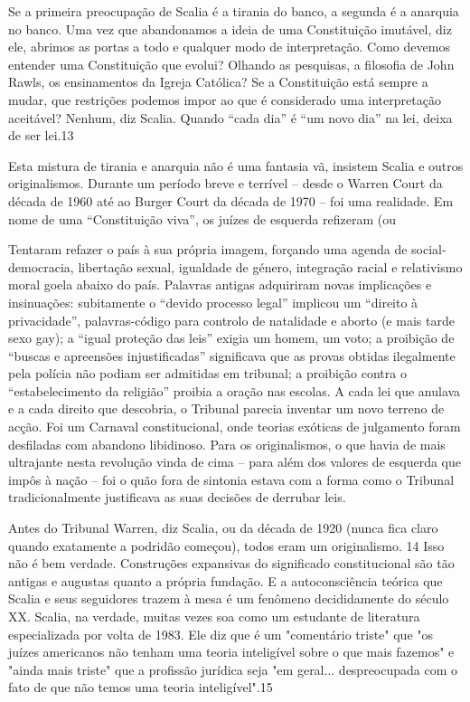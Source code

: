 \par 
Se a primeira preocupação de Scalia é a tirania do banco, a segunda é a anarquia no banco. Uma vez que abandonamos a ideia de uma Constituição imutável, diz ele, abrimos as portas a todo e qualquer modo de interpretação. Como devemos entender uma Constituição que evolui? Olhando as pesquisas, a filosofia de John Rawls, os ensinamentos da Igreja Católica? Se a Constituição está sempre a mudar, que restrições podemos impor ao que é considerado uma interpretação aceitável? Nenhum, diz Scalia. Quando “cada dia” é “um novo dia” na lei, deixa de ser lei.{\color{blue}13}
 \par 
Esta mistura de tirania e anarquia não é uma fantasia vã, insistem Scalia e outros originalismos. Durante um período breve e terrível – desde o Warren Court da década de 1960 até ao Burger Court da década de 1970 – foi uma realidade. Em nome de uma “Constituição viva”, os juízes de esquerda refizeram (ou
 \par 
Tentaram refazer o país à sua própria imagem, forçando uma agenda de social-democracia, libertação sexual, igualdade de género, integração racial e relativismo moral goela abaixo do país. Palavras antigas adquiriram novas implicações e insinuações: subitamente o “devido processo legal” implicou um “direito à privacidade”, palavras-código para controlo de natalidade e aborto (e mais tarde sexo gay); a “igual proteção das leis” exigia um homem, um voto; a proibição de “buscas e apreensões injustificadas” significava que as provas obtidas ilegalmente pela polícia não podiam ser admitidas em tribunal; a proibição contra o “estabelecimento da religião” proibia a oração nas escolas. A cada lei que anulava e a cada direito que descobria, o Tribunal parecia inventar um novo terreno de acção. Foi um Carnaval constitucional, onde teorias exóticas de julgamento foram desfiladas com abandono libidinoso. Para os originalismos, o que havia de mais ultrajante nesta revolução vinda de cima – para além dos valores de esquerda que impôs à nação – foi o quão fora de sintonia estava com a forma como o Tribunal tradicionalmente justificava as suas decisões de derrubar leis.
 \par 
Antes do Tribunal Warren, diz Scalia, ou da década de 1920 (nunca fica claro quando exatamente a podridão começou), todos eram um originalismo. {\color{blue}14} Isso não é bem verdade. Construções expansivas do significado constitucional são tão antigas e augustas quanto a própria fundação. E a autoconsciência teórica que Scalia e seus seguidores trazem à mesa é um fenômeno decididamente do século XX. Scalia, na verdade, muitas vezes soa como um estudante de literatura especializada por volta de 1983. Ele diz que é um "comentário triste" que "os juízes americanos não tenham uma teoria inteligível sobre o que mais fazemos" e "ainda mais triste" que a profissão jurídica seja "em geral... despreocupada com o fato de que não temos uma teoria inteligível".{\color{blue}15}
